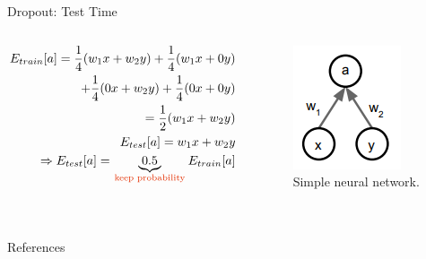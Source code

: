\documentclass[compress,oilve,t]{beamer}
\newcommand{\tc}[2]{
	\textcolor{#1}{\hspace{-2pt}#2\hspace{-2pt}}
}
\begin{document}
\begin{frame}{Dropout: Test Time}
	\begin{columns}
		\begin{column}{0.5\textwidth}
			\begin{align*}
				E_{train}[a] = \frac{1}{4}(w_1 x + w_2 y)
				+ \frac{1}{4}(w_1 x + 0 y) \\
				+ \frac{1}{4}(0 x + w_2 y) + \frac{1}{4}(0 x + 0 y) \\
				= \frac{1}{2}(w_1 x + w_2 y) \\
				E_{test}[a] = w_1 x + w_2 y \\
				\Rightarrow E_{test}[a] = \underbrace{0.5}_{\text{\tc{keywords}{keep probability}}} E_{train}[a]
			\end{align*}
		\end{column}
		\begin{column}{0.5\textwidth}
			\begin{figure}[H]
				\centering
				\includegraphics[height=0.4\textheight]{Figs/section_4/dropout_test.png}
				\caption{Simple neural network. \cite{cs231n-2018-lecture7}}
			\end{figure}
		\end{column}
	\end{columns}
\end{frame}


\section{}


\begin{frame}{References}

\end{frame}
\end{document}
